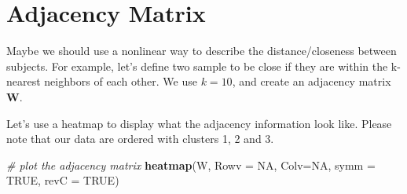 \documentclass[
]{book}
\newenvironment{Shaded}{\begin{snugshade}}{\end{snugshade}}
\newcommand{\AttributeTok}[1]{\textcolor[rgb]{0.13,0.29,0.53}{#1}}
\newcommand{\CommentTok}[1]{\textcolor[rgb]{0.56,0.35,0.01}{\textit{#1}}}
\newcommand{\ConstantTok}[1]{\textcolor[rgb]{0.56,0.35,0.01}{#1}}
\newcommand{\ControlFlowTok}[1]{\textcolor[rgb]{0.13,0.29,0.53}{\textbf{#1}}}
\newcommand{\DecValTok}[1]{\textcolor[rgb]{0.00,0.00,0.81}{#1}}
\newcommand{\DocumentationTok}[1]{\textcolor[rgb]{0.56,0.35,0.01}{\textbf{\textit{#1}}}}
\newcommand{\FloatTok}[1]{\textcolor[rgb]{0.00,0.00,0.81}{#1}}
\newcommand{\FunctionTok}[1]{\textcolor[rgb]{0.13,0.29,0.53}{\textbf{#1}}}
\newcommand{\NormalTok}[1]{#1}
\newcommand{\OtherTok}[1]{\textcolor[rgb]{0.56,0.35,0.01}{#1}}
\newcommand{\SpecialCharTok}[1]{\textcolor[rgb]{0.81,0.36,0.00}{\textbf{#1}}}
\theoremstyle{definition}
\theoremstyle{definition}
\theoremstyle{definition}
\theoremstyle{definition}
\theoremstyle{remark}
\begin{document}
\hypertarget{adjacency-matrix}{%
\section{Adjacency Matrix}\label{adjacency-matrix}}

Maybe we should use a nonlinear way to describe the distance/closeness between subjects. For example, let's define two sample to be close if they are within the k-nearest neighbors of each other. We use \(k = 10\), and create an adjacency matrix \(\mathbf{W}\).

\begin{Shaded}
\end{Shaded}

Let's use a heatmap to display what the adjacency information look like. Please note that our data are ordered with clusters 1, 2 and 3.

\begin{Shaded}
\begin{Highlighting}[]
  \CommentTok{\# plot the adjacency matrix}
  \FunctionTok{heatmap}\NormalTok{(W, }\AttributeTok{Rowv =} \ConstantTok{NA}\NormalTok{, }\AttributeTok{Colv=}\ConstantTok{NA}\NormalTok{, }\AttributeTok{symm =} \ConstantTok{TRUE}\NormalTok{, }\AttributeTok{revC =} \ConstantTok{TRUE}\NormalTok{)}
\end{Highlighting}
\end{Shaded}
\end{document}
